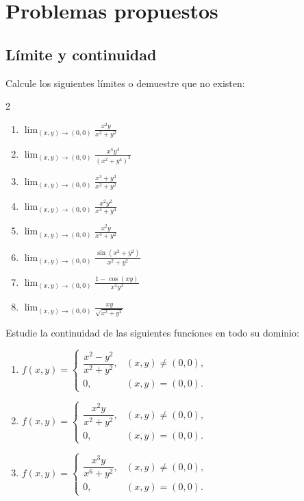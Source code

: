
\section*{Problemas propuestos}

\subsection*{Límite y continuidad}

\begin{prob}
Calcule los siguientes límites o demuestre que no existen:
\begin{multicols}{2}
\begin{enumerate}
    \item $\displaystyle\lim_{(x,y)\to(0,0)} \frac{x^2 y}{x^2+y^2}$
    \item $\displaystyle\lim_{(x,y)\to(0,0)} \frac{x^4 y^4}{(x^2+y^4)^3}$
    \item $\displaystyle\lim_{(x,y)\to(0,0)} \frac{x^3+y^3}{x^2+y^2}$
    \item $\displaystyle\lim_{(x,y)\to(0,0)} \frac{x^2 y^2}{x^4+y^4}$
    \item $\displaystyle\lim_{(x,y)\to(0,0)} \frac{x^2 y}{x^4+y^2}$
    \item $\displaystyle\lim_{(x,y)\to(0,0)} \frac{\sin(x^2+y^2)}{x^2+y^2}$
    \item $\displaystyle\lim_{(x,y)\to(0,0)} \frac{1-\cos(xy)}{x^2 y^2}$
    \item $\displaystyle\lim_{(x,y)\to(0,0)} \frac{x y}{\sqrt{x^2+y^2}}$
\end{enumerate}
\end{multicols}
\end{prob}

\begin{prob}
Estudie la continuidad de las siguientes funciones en todo su dominio:
\begin{enumerate}
    \item $f(x,y)=\begin{cases}
    \dfrac{x^2-y^2}{x^2+y^2}, & (x,y)\neq(0,0),\\
    0, & (x,y)=(0,0).
    \end{cases}$
    \item $f(x,y)=\begin{cases}
    \dfrac{x^2 y}{x^2+y^2}, & (x,y)\neq(0,0),\\
    0, & (x,y)=(0,0).
    \end{cases}$
    \item $f(x,y)=\begin{cases}
    \dfrac{x^3 y}{x^6+y^2}, & (x,y)\neq(0,0),\\
    0, & (x,y)=(0,0).
    \end{cases}$
\end{enumerate}
\end{prob}

